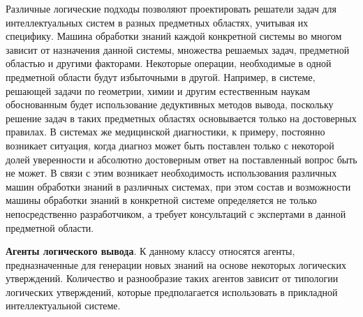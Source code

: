 Различные логические подходы позволяют проектировать решатели задач для интеллектуальных систем в разных предметных областях, учитывая их специфику.
Машина обработки знаний каждой конкретной системы во многом зависит от назначения данной системы, множества решаемых задач, предметной областью и другими факторами. Некоторые операции, необходимые в одной предметной области будут избыточными в другой. Например, в системе, решающей задачи по геометрии, химии и другим естественным наукам обоснованным будет использование дедуктивных методов вывода, поскольку решение задач в таких предметных областях основывается только на достоверных правилах. В системах же медицинской диагностики, к примеру, постоянно возникает ситуация, когда диагноз может быть поставлен только с некоторой долей уверенности и абсолютно достоверным ответ на поставленный вопрос быть не может. В связи с этим возникает необходимость использования различных машин обработки знаний в различных системах, при этом состав и возможности машины обработки знаний в конкретной системе определяется не только непосредственно разработчиком, а требует консультаций с экспертами в данной предметной области.

\textbf{Агенты логического вывода}. К данному классу относятся агенты, предназначенные для генерации новых знаний на основе некоторых логических утверждений. Количество и разнообразие таких агентов зависит от типологии логических утверждений, которые предполагается использовать в прикладной интеллектуальной системе.

